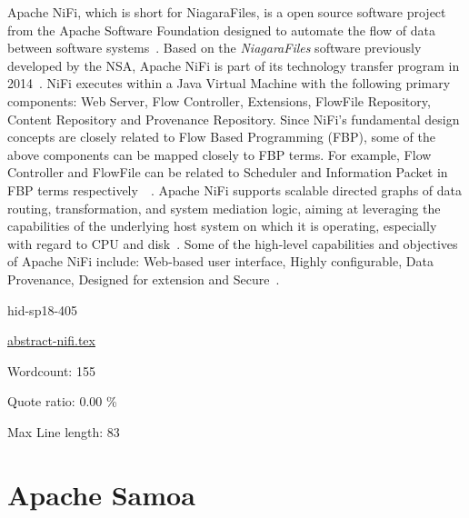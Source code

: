 Apache NiFi, which is short for NiagaraFiles, is a open source
software project from the Apache Software Foundation designed to
automate the flow of data between software
systems~\cite{hid-sp18-405-wiki-nifi}. Based on the \emph{NiagaraFiles}
software previously developed by the NSA, Apache NiFi is part of its
technology transfer program in 2014~\cite{hid-sp18-405-wiki-nifi}.
NiFi executes within a Java Virtual Machine with the following primary
components: Web Server, Flow Controller, Extensions, FlowFile
Repository, Content Repository and Provenance Repository. Since NiFi's
fundamental design concepts are closely related to Flow Based
Programming (FBP), some of the above components can be mapped closely
to FBP terms. For example, Flow Controller and FlowFile can be related
to Scheduler and Information Packet in FBP terms
respectively~\cite{hid-sp18-405-wwwoverview-nifi}~\cite{hid-sp18-405-wikifbp-nifi}.
Apache NiFi supports scalable directed graphs of data routing,
transformation, and system mediation logic, aiming at leveraging the
capabilities of the underlying host system on which it is operating,
especially with regard to CPU and
disk~\cite{hid-sp18-405-wwwoverview-nifi}. Some of the high-level
capabilities and objectives of Apache NiFi include: Web-based user
interface, Highly configurable, Data Provenance, Designed for
extension and Secure~\cite{hid-sp18-405-www-nifi}.


\begin{IU}

hid-sp18-405

\href{https://github.com/cloudmesh-community/hid-sp18-405/blob/master//technology/abstract-nifi.tex}{abstract-nifi.tex}

 

Wordcount: 155


Quote ratio: 0.00 \%
 
Max Line length: 83
\end{IU}

\section{Apache Samoa}

